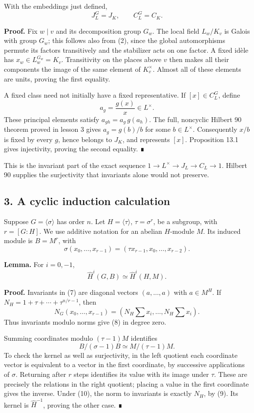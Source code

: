 \documentclass[11pt,a4paper]{article}
\begin{document}
With the embeddings just defined, \[
J_L^G=J_K,\qquad C_L^G=C_K.
\tag{6}
\]

\textbf{Proof.} Fix \(w\mid v\) and its decomposition group \(G_w\). The
local field \(L_w/K_v\) is Galois with group \(G_w\); this follows also
from (2), since the global automorphisms permute its factors
transitively and the stabilizer acts on one factor. A fixed idèle has
\(x_w\in L_w^{G_w}=K_v\). Transitivity on the places above \(v\) then
makes all their components the image of the same element of
\(K_v^\times\). Almost all of these elements are units, proving the
first equality.

A fixed class need not initially have a fixed representative. If
\([x]\in C_L^G\), define \[
a_g=\frac{g(x)}x\in L^\times.
\] These principal elements satisfy \(a_{gh}=a_g\,g(a_h)\). The full,
noncyclic Hilbert 90 theorem proved in lesson 3 gives \(a_g=g(b)/b\) for
some \(b\in L^\times\). Consequently \(x/b\) is fixed by every \(g\),
hence belongs to \(J_K\), and represents \([x]\). Proposition 13.1 gives
injectivity, proving the second equality. ∎

This is the invariant part of the exact sequence
\(1\to L^\times\to J_L\to C_L\to1\). Hilbert 90 supplies the
surjectivity that invariants alone would not preserve.

\subsection{3. A cyclic induction
calculation}\label{a-cyclic-induction-calculation}

Suppose \(G=\langle\sigma\rangle\) has order \(n\). Let
\(H=\langle\tau\rangle\), \(\tau=\sigma^r\), be a subgroup, with
\(r=[G:H]\). We use additive notation for an abelian \(H\)-module \(M\).
Its induced module is \(B=M^r\), with \[
\sigma(x_0,\ldots,x_{r-1})=(\tau x_{r-1},x_0,\ldots,x_{r-2}).
\tag{7}
\]

\textbf{Lemma.} For \(i=0,-1\), \[
\widehat H^i(G,B)\simeq\widehat H^i(H,M).
\tag{8}
\]

\textbf{Proof.} Invariants in (7) are diagonal vectors \((a,\ldots,a)\)
with \(a\in M^H\). If \(N_H=1+\tau+\cdots+\tau^{n/r-1}\), then \[
N_G(x_0,\ldots,x_{r-1})
=(N_H\textstyle\sum x_i,\ldots,N_H\sum x_i).
\tag{9}
\] Thus invariants modulo norms give (8) in degree zero.

Summing coordinates modulo \((\tau-1)M\) identifies \[
B/(\sigma-1)B\simeq M/(\tau-1)M.
\tag{10}
\] To check the kernel as well as surjectivity, in the left quotient
each coordinate vector is equivalent to a vector in the first
coordinate, by successive applications of \(\sigma\). Returning after
\(r\) steps identifies its value with its image under \(\tau\). These
are precisely the relations in the right quotient; placing a value in
the first coordinate gives the inverse. Under (10), the norm to
invariants is exactly \(N_H\), by (9). Its kernel is
\(\widehat H^{-1}\), proving the other case. ∎
\end{document}
